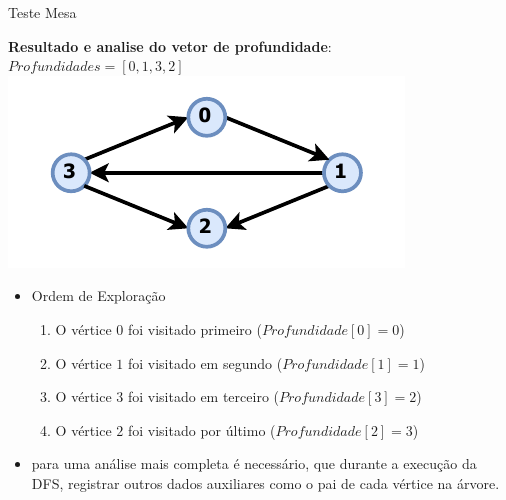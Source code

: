 \documentclass{if-beamer}
\begin{document}
\begin{frame}{Teste Mesa}
\begin{overlayarea}{\textwidth}{\textheight}
{\begin{enumerate}
					
			\end{enumerate}
		}
		 {
			\textbf{Resultado e analise do vetor de profundidade}: $ Profundidades = [0, 1, 3, 2] $
			\includegraphics{Figuras/teste-mesa/mesa-19.pdf}
			\begin{itemize}
				\item Ordem de Exploração
				\begin{enumerate}
					\item  O vértice $0$ foi visitado primeiro ($Profundidade[0] = 0$)
					\item  O vértice $1$ foi visitado em segundo ($Profundidade[1] = 1$)
					\item  O vértice $3$ foi visitado em terceiro ($Profundidade[3] = 2$)
					\item  O vértice $2$ foi visitado por último ($Profundidade[2] = 3$)
				\end{enumerate}
				\item para uma análise mais completa é necessário, que durante a execução da DFS, registrar outros dados auxiliares como o pai de cada vértice na árvore.
			\end{itemize}
		}
	\end{overlayarea}
	
	
	
\end{frame}
\end{document}
